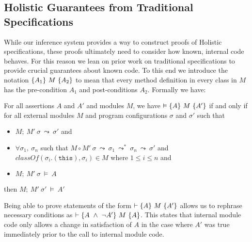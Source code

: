 \subsection{Holistic Guarantees from Traditional Specifications}

While our inference system provides a way to construct proofs of
Holistic specifications, these proofs ultimately need to consider
how known, internal code behaves. For this reason we lean on prior work 
on traditional specifications to provide crucial guarantees 
about known code. To this end we introduce the notation $\{A_1\}\ M\ \{A_2\}$ to
mean that every method definition in every class in $M$
has the pre-condition $A_1$ and post-conditions $A_2$. Formally 
we have:
\begin{definition}
\label{def:hoareMdl}
For all assertions $A$ and $A'$ and modules $M$, we have
$\vDash\{A\}\ M\ \{A'\}$ if and only if
for all external modules $M$ and program configurations $\sigma$ and $\sigma'$ such that
\begin{itemize}
\item
$M;\ M'\ \sigma\ \leadsto\ \sigma'$ and
\item
$\forall \sigma_1,\ \sigma_n$ such that 
$M\circ M'\ \sigma\ \leadsto\ \sigma_1\ \leadsto^*\ \sigma_n\ \leadsto\ \sigma'$  and $classOf(\sigma_i.(\texttt{this}), \sigma_i) \in M$ where $1 \leq i \leq n$ and
\item
$M;\ M'\ \sigma\ \vDash\ A$
\end{itemize}
then 
$M;\ M'\ \sigma'\ \vDash\ A'$
\end{definition}
Being able to prove statements of the form $\vdash\{A\}\ M\ \{A'\}$ allows us 
to rephrase necessary conditions as $\vdash\{A\ \wedge\ \neg A'\}\ M\ \{A\}$.
This states that internal module code only allows a change in satisfaction of $A$
in the case where $A'$ was true immediately prior to the call to internal module code.

